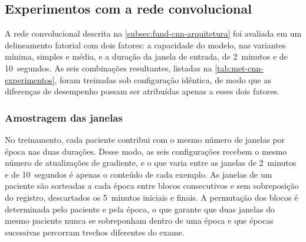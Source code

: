 \subsection{Experimentos com a rede convolucional}
\label{subsec:met-cnn-experimentos}

A rede convolucional descrita na \autoref{subsec:fund-cnn-arquitetura} foi
avaliada em um delineamento fatorial com dois fatores: a capacidade do
modelo, nas variantes mínima, simples e média, e a duração da janela de
entrada, de 2~minutos e de 10~segundos. As seis combinações resultantes,
listadas na \autoref{tab:met-cnn-experimentos}, foram treinadas sob
configuração idêntica, de modo que as diferenças de desempenho possam ser
atribuídas apenas a esses dois fatores.

\begin{table}[h!]
	\captionsetup{width=12cm}
\end{table}

\subsubsection{Amostragem das janelas}

No treinamento, cada paciente contribui com o mesmo número de janelas por
época nas duas durações. Desse modo, as seis configurações recebem o mesmo
número de atualizações de gradiente, e o que varia entre as janelas de
2~minutos e de 10~segundos é apenas o conteúdo de cada exemplo. As janelas
de um paciente são sorteadas a cada época entre blocos consecutivos e sem
sobreposição do registro, descartados os 5~minutos iniciais e finais. A
permutação dos blocos é determinada pelo paciente e pela época, o que
garante que duas janelas do mesmo paciente nunca se sobreponham dentro de
uma época e que épocas sucessivas percorram trechos diferentes do exame.

